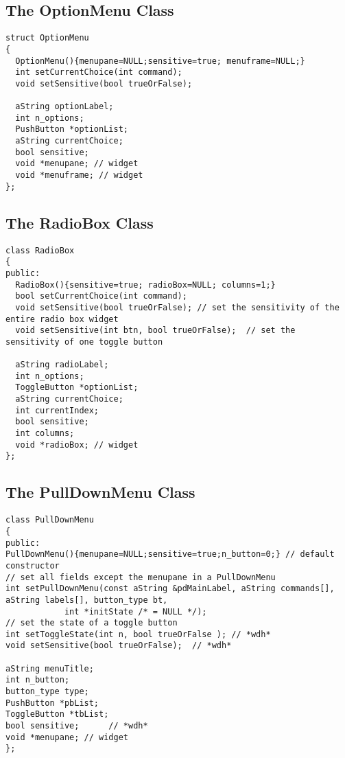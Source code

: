 \documentclass{article}
\begin{document}
\subsection{The OptionMenu Class}
\begin{verbatim}
struct OptionMenu
{
  OptionMenu(){menupane=NULL;sensitive=true; menuframe=NULL;}
  int setCurrentChoice(int command);
  void setSensitive(bool trueOrFalse);

  aString optionLabel;
  int n_options;
  PushButton *optionList;
  aString currentChoice;
  bool sensitive;     
  void *menupane; // widget
  void *menuframe; // widget
};
\end{verbatim}


\subsection{The RadioBox Class}
\begin{verbatim}
class RadioBox
{
public:
  RadioBox(){sensitive=true; radioBox=NULL; columns=1;} 
  bool setCurrentChoice(int command);          
  void setSensitive(bool trueOrFalse); // set the sensitivity of the entire radio box widget
  void setSensitive(int btn, bool trueOrFalse);  // set the sensitivity of one toggle button 

  aString radioLabel;
  int n_options;
  ToggleButton *optionList;
  aString currentChoice;
  int currentIndex;
  bool sensitive;
  int columns;
  void *radioBox; // widget
};
\end{verbatim}


\subsection{The PullDownMenu Class}\label{sec:pull-down}
\begin{verbatim}
class PullDownMenu
{
public:
PullDownMenu(){menupane=NULL;sensitive=true;n_button=0;} // default constructor
// set all fields except the menupane in a PullDownMenu
int setPullDownMenu(const aString &pdMainLabel, aString commands[], aString labels[], button_type bt, 
		    int *initState /* = NULL */); 
// set the state of a toggle button
int setToggleState(int n, bool trueOrFalse ); // *wdh*
void setSensitive(bool trueOrFalse);  // *wdh*

aString menuTitle;
int n_button;
button_type type;
PushButton *pbList;
ToggleButton *tbList;
bool sensitive;      // *wdh*
void *menupane; // widget
};
\end{verbatim}

\end{document}
